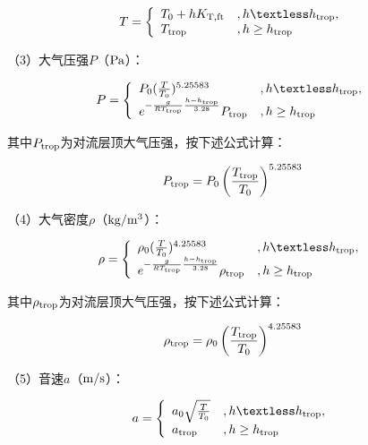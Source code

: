 \documentclass[a4paper,punct,space,heading=true,AutoFakeBold]{ctexrep}
\begin{document}
\begin{equation}
T=\left\{\begin{array}{ll}
T_{\rm 0}+h K_{\rm T,ft}   &   , h\textless h_{\rm trop},\\
T_{\rm trop}   &   , h\geq h_{\rm trop}
\end{array}\right.
\end{equation}

（3）大气压强$P$（$\rm Pa$）：

\begin{equation}
P=\left\{\begin{array}{ll}
P_{\rm 0}(\frac{T}{T_{\rm 0}})^{5.25583}   &   , h\textless h_{\rm trop},\\
e^{-\frac{g}{R T_{\rm trop}} \frac{h-h_{\rm trop}}{3.28}}P_{\rm trop}   &   , h\geq h_{\rm trop}
\end{array}\right.
\end{equation}

其中$P_{\rm trop}$为对流层顶大气压强，按下述公式计算：

\begin{equation}
P_{\rm trop}=P_{\rm 0}\left(\frac{T_{\rm trop}}{T_{\rm 0}}\right)^{5.25583}
\end{equation}

（4）大气密度$\rho$（$\rm kg/m^3$）：

\begin{equation}
\rho=\left\{\begin{array}{ll}
\rho_{\rm 0}(\frac{T}{T_{\rm 0}})^{4.25583}   &   , h\textless h_{\rm trop},\\
e^{-\frac{g}{R T_{\rm trop}} \frac{h-h_{\rm trop}}{3.28}}\rho_{\rm trop}   &   , h\geq h_{\rm trop}
\end{array}\right.
\end{equation}

其中$\rho_{\rm trop}$为对流层顶大气压强，按下述公式计算：

\begin{equation}
\rho_{\rm trop}=\rho_{\rm 0}\left(\frac{T_{\rm trop}}{T_{\rm 0}}\right)^{4.25583}
\end{equation}

（5）音速$a$（$\rm m/s$）：

\begin{equation}
a=\left\{\begin{array}{ll}
a_{\rm 0}\sqrt{\frac{T}{T_{\rm 0}}}   &   , h\textless h_{\rm trop},\\
a_{\rm trop}   &   , h\geq h_{\rm trop}
\end{array}\right.
\end{equation}
\end{document}
